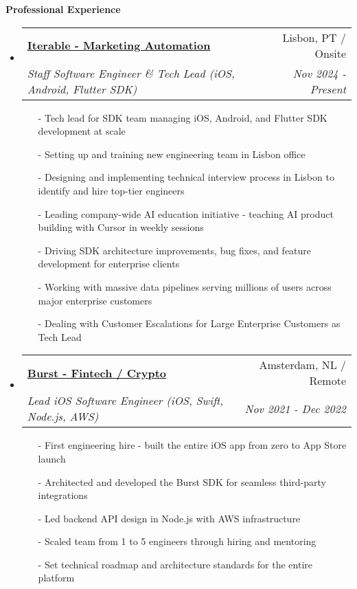 \documentclass[letterpaper,11pt]{article}
\makeatletter
\newcommand{\resheading}[1]{{\large \colorbox{mygrey}{\begin{minipage}{\textwidth}{\textbf{#1 \vphantom{p\^{E}}}}\end{minipage}}}}
\newcommand{\ressubheading}[4]{
\begin{tabular*}{7.0in}{l@{\extracolsep{\fill}}r}
    \textbf{#1} & #2 \\
    \textit{#3} & \textit{#4} \\
\end{tabular*}\vspace{-6pt}}
\makeatother
\begin{document}
\resheading{Professional Experience}
\begin{itemize}

\item
    \ressubheading{\href{https://iterable.com}{Iterable - Marketing Automation}}{Lisbon, PT / Onsite}{Staff Software Engineer \& Tech Lead (iOS, Android, Flutter SDK)}{Nov 2024 - Present}
    \begin{itemize}
        \item[-]{Tech lead for SDK team managing iOS, Android, and Flutter SDK development at scale}
        \item[-]{Setting up and training new engineering team in Lisbon office}
        \item[-]{Designing and implementing technical interview process in Lisbon to identify and hire top-tier engineers}
        \item[-]{Leading company-wide AI education initiative - teaching AI product building with Cursor in weekly sessions}
        \item[-]{Driving SDK architecture improvements, bug fixes, and feature development for enterprise clients}
        \item[-]{Working with massive data pipelines serving millions of users across major enterprise customers}
        \item[-]{Dealing with Customer Escalations for Large Enterprise Customers as Tech Lead}
    \end{itemize}

\item
    \ressubheading{\href{https://www.joinburst.com}{Burst - Fintech / Crypto}}{Amsterdam, NL / Remote}{Lead iOS Software Engineer (iOS, Swift, Node.js, AWS)}{Nov 2021 - Dec 2022}
    \begin{itemize}
        \item[-]{First engineering hire - built the entire iOS app from zero to App Store launch}
        \item[-]{Architected and developed the Burst SDK for seamless third-party integrations}
        \item[-]{Led backend API design in Node.js with AWS infrastructure}
        \item[-]{Scaled team from 1 to 5 engineers through hiring and mentoring}
        \item[-]{Set technical roadmap and architecture standards for the entire platform}
    \end{itemize}


\end{itemize}
\end{document}
